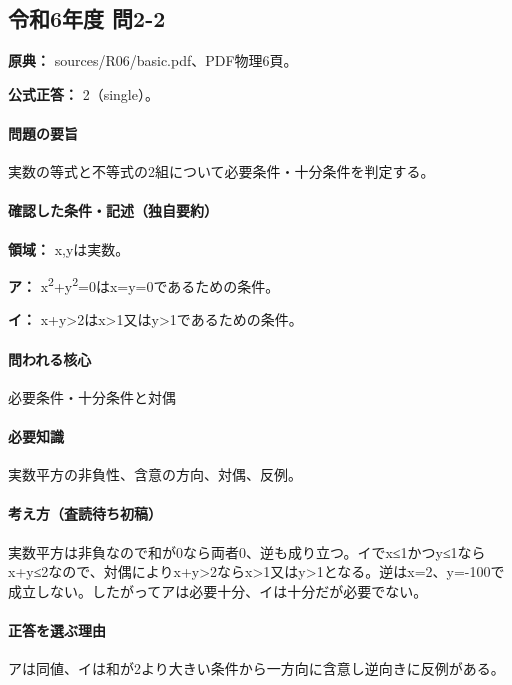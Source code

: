 \subsection{令和6年度 問2-2}
\label{q:r06-reg-basic-2-2}

\noindent\textbf{原典：} sources/R06/basic.pdf、PDF物理6頁。

\textbf{公式正答：} 2（single）。

\paragraph{問題の要旨} 実数の等式と不等式の2組について必要条件・十分条件を判定する。

\paragraph{確認した条件・記述（独自要約）}\mbox{}\par

\noindent\textbf{領域：} x,yは実数。\par

\noindent\textbf{ア：} x\textsuperscript{2}+y\textsuperscript{2}=0はx=\allowbreak{}y=\allowbreak{}0であるための条件。\par

\noindent\textbf{イ：} x+y>2はx>1又はy>1であるための条件。\par

\paragraph{問われる核心} 必要条件・十分条件と対偶

\paragraph{必要知識} 実数平方の非負性、含意の方向、対偶、反例。

\paragraph{考え方（査読待ち初稿）} 実数平方は非負なので和が0なら両者0、逆も成り立つ。イでx≤1かつy≤1ならx+y≤2なので、対偶によりx+y>2ならx>1又はy>1となる。逆はx=\allowbreak{}2、y=-100で成立しない。したがってアは必要十分、イは十分だが必要でない。

\paragraph{正答を選ぶ理由} アは同値、イは和が2より大きい条件から一方向に含意し逆向きに反例がある。

